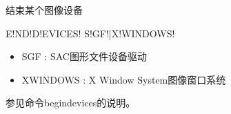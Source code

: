 \label{cmd:enddevices}

结束某个图像设备

\begin{SACSTX}
E!ND!D!EVICES! S!GF!|X!WINDOWS!
\end{SACSTX}

\begin{itemize}
\item SGF : SAC图形文件设备驱动
\item XWINDOWS : X Window System图像窗口系统
\end{itemize}

参见命令begindevices的说明。

